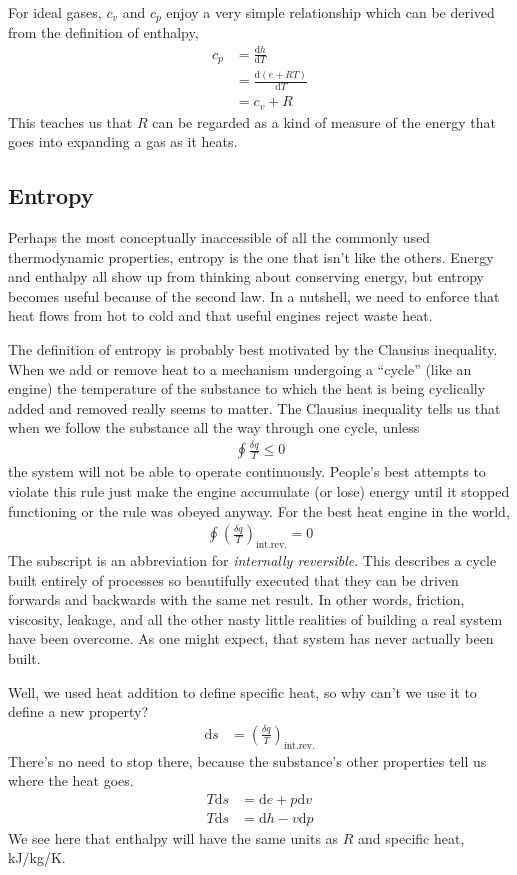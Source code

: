 For ideal gases, $c_v$ and $c_p$ enjoy a very simple relationship which can be derived from the definition of enthalpy,
\begin{align}
c_p &= \frac{\mathrm{d} h}{\mathrm{d} T}\nonumber\\
 &= \frac{\mathrm{d} (e + RT)}{\mathrm{d} T}\nonumber\\
 &= c_v + R
\end{align}
This teaches us that $R$ can be regarded as a kind of measure of the energy that goes into expanding a gas as it heats.

\subsection{Entropy}
Perhaps the most conceptually inaccessible of all the commonly used thermodynamic properties, entropy is the one that isn't like the others.  Energy and enthalpy all show up from thinking about conserving energy, but entropy becomes useful because of the second law.  In a nutshell, we need to enforce that heat flows from hot to cold and that useful engines reject waste heat.

The definition of entropy is probably best motivated by the Clausius inequality.  When we add or remove heat to a mechanism undergoing a ``cycle'' (like an engine) the temperature of the substance to which the heat is being cyclically added and removed really seems to matter.  The Clausius inequality tells us that when we follow the substance all the way through one cycle, unless
\begin{align}
\oint \frac{\delta q}{T} \le 0
\end{align}
the system will not be able to operate continuously.  People's best attempts to violate this rule just make the engine accumulate (or lose) energy until it stopped functioning or the rule was obeyed anyway.  For the best heat engine in the world,
\begin{align}
\oint \left(\frac{\delta q}{T}\right)_{\mathrm{int.rev.}} = 0
\end{align}
The subscript is an abbreviation for \emph{internally reversible}.  This describes a cycle built entirely of processes so beautifully executed that they can be driven forwards and backwards with the same net result.  In other words, friction, viscosity, leakage, and all the other nasty little realities of building a real system have been overcome.  As one might expect, that system has never actually been built.

Well, we used heat addition to define specific heat, so why can't we use it to define a new property?
\begin{align}
\mathrm{d}s &= \left(\frac{\delta q}{T}\right)_{\mathrm{int.rev.}}\label{eqn:sdef}
\end{align}
There's no need to stop there, because the substance's other properties tell us where the heat goes.
\begin{align}
T \mathrm{d}s &= \mathrm{d}e + p\mathrm{d}v\\
T \mathrm{d}s &= \mathrm{d}h - v\mathrm{d}p\label{eqn:dsdh}
\end{align}
We see here that enthalpy will have the same units as $R$ and specific heat, kJ/kg/K.

